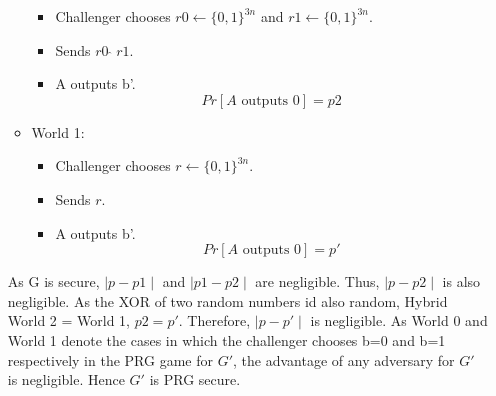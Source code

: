 \documentclass{article}
\begin{document}
\begin{enumerate}[label=\roman*.]
\begin{itemize}
\begin{itemize}
            \item Challenger chooses $r0\leftarrow\{0,1\}^{3n}$ and $r1\leftarrow\{0,1\}^{3n}$.
            \item Sends $r0\; \widehat{}\; r1$.
            \item A outputs b'.
            \[Pr[A \text{ outputs }0]=p2\]
        \end{itemize}
        \item World 1:
        \begin{itemize}
            \item Challenger chooses $r\leftarrow\{0,1\}^{3n}$.
            \item Sends $r$.
            \item A outputs b'.
            \[Pr[A \text{ outputs }0]=p'\]
        \end{itemize}
    \end{itemize}
    As G is secure, $\mid p-p1 \mid$ and $\mid p1-p2 \mid$ are negligible.
    Thus, $\mid p-p2 \mid$ is also negligible. As the XOR of two random numbers id also random, Hybrid World 2 = World 1, $p2=p'$. Therefore, $\mid p-p' \mid$ is negligible. As World 0 and World 1 denote the cases in which the challenger chooses b=0 and b=1 respectively in the PRG game for $G'$, the advantage of any adversary for $G'$ is negligible.
    Hence $G'$ is PRG secure.
\end{enumerate}
\end{document}

